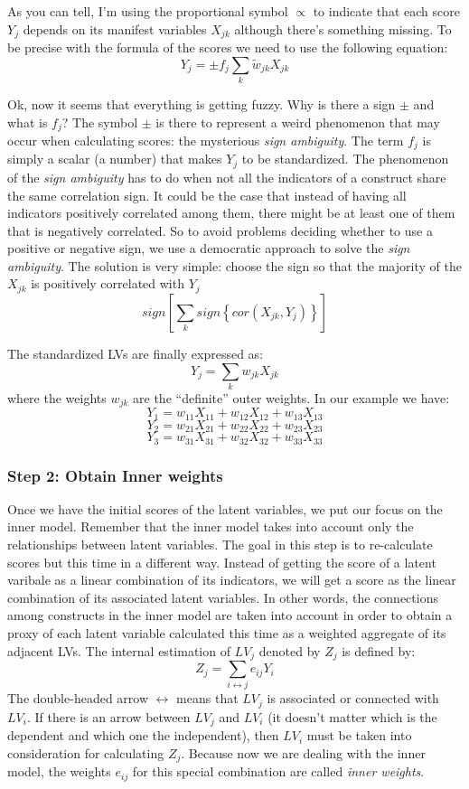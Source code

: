 \documentclass[12pt]{book}\usepackage{graphicx, color}
\begin{document}
As you can tell, I'm using the proportional symbol $\propto$ to indicate that each score $Y_j$ depends on its manifest variables $X_{jk}$ although there's something missing. To be precise with the formula of the scores we need to use the following equation:
$$ Y_j = \pm f_j \sum_{k} \tilde{w}_{jk} X_{jk} $$

Ok, now it seems that everything is getting fuzzy. Why is there a sign $\pm$ and what is $f_j$? The symbol $\pm$ is there to represent a weird phenomenon that may occur when calculating scores: the mysterious \textit{sign ambiguity}. The term $f_j$ is simply a scalar (a number) that makes $Y_j$ to be standardized. The phenomenon of the \textit{sign ambiguity} has to do when not all the indicators of a construct share the same correlation sign. It could be the case that instead of having all indicators positively correlated among them, there might be at least one of them that is negatively correlated. So to avoid problems deciding whether to use a positive or negative sign, we use a democratic approach to solve the \textit{sign ambiguity}. The solution is very simple: choose the sign so that the majority of the $X_{jk}$ is positively correlated with $Y_j$
$$sign\left[  \sum_{k} sign\left\{cor(X_{jk}, Y_j)\right\} \right]$$

The standardized LVs are finally expressed as:
$$ Y_j = \sum_{k} w_{jk} X_{jk} $$
where the weights $w_{jk}$ are the ``definite'' outer weights. In our example we have:
$$ Y_1 = w_{11} X_{11} + w_{12} X_{12} + w_{13} X_{13} $$
$$ Y_2 = w_{21} X_{21} + w_{22} X_{22} + w_{23} X_{23} $$
$$ Y_3 = w_{31} X_{31} + w_{32} X_{32} + w_{33} X_{33} $$


\subsubsection*{Step 2: Obtain Inner weights}
Once we have the initial scores of the latent variables, we put our focus on the inner model. Remember that the inner model takes into account only the relationships between latent variables. The goal in this step is to re-calculate scores but this time in a different way. Instead of getting the score of a latent varibale as a linear combination of its indicators, we will get a score as the linear combination of its associated latent variables. In other words, the connections among constructs in the inner model are taken into account in order to obtain a proxy of each latent variable calculated this time as a weighted aggregate of its adjacent LVs. The internal estimation of $LV_j$ denoted by $Z_j$ is defined by:
$$ Z_j = \sum_{i \longleftrightarrow j} e_{ij} Y_i $$
The double-headed arrow $\longleftrightarrow$ means that $LV_j$ is associated or connected with $LV_i$. If there is an arrow between $LV_j$ and $LV_i$ (it doesn't matter which is the dependent and which one the independent), then $LV_i$ must be taken into consideration for calculating $Z_j$. Because now we are dealing with the inner model, the weights $e_{ij}$ for this special combination are called \textit{inner weights}. 
\end{document}
